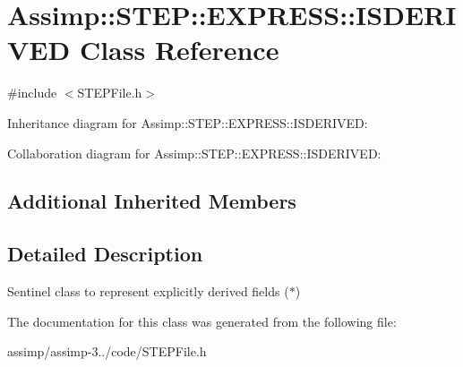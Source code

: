 \hypertarget{class_assimp_1_1_s_t_e_p_1_1_e_x_p_r_e_s_s_1_1_i_s_d_e_r_i_v_e_d}{\section{Assimp\+:\+:S\+T\+E\+P\+:\+:E\+X\+P\+R\+E\+S\+S\+:\+:I\+S\+D\+E\+R\+I\+V\+E\+D Class Reference}
\label{class_assimp_1_1_s_t_e_p_1_1_e_x_p_r_e_s_s_1_1_i_s_d_e_r_i_v_e_d}
}


{\ttfamily \#include $<$S\+T\+E\+P\+File.\+h$>$}



Inheritance diagram for Assimp\+:\+:S\+T\+E\+P\+:\+:E\+X\+P\+R\+E\+S\+S\+:\+:I\+S\+D\+E\+R\+I\+V\+E\+D\+:


Collaboration diagram for Assimp\+:\+:S\+T\+E\+P\+:\+:E\+X\+P\+R\+E\+S\+S\+:\+:I\+S\+D\+E\+R\+I\+V\+E\+D\+:
\subsection*{Additional Inherited Members}


\subsection{Detailed Description}
Sentinel class to represent explicitly derived fields ($\ast$) 

The documentation for this class was generated from the following file\+:\begin{DoxyCompactItemize}
\item 
assimp/assimp-\/3../code/S\+T\+E\+P\+File.\+h\end{DoxyCompactItemize}
